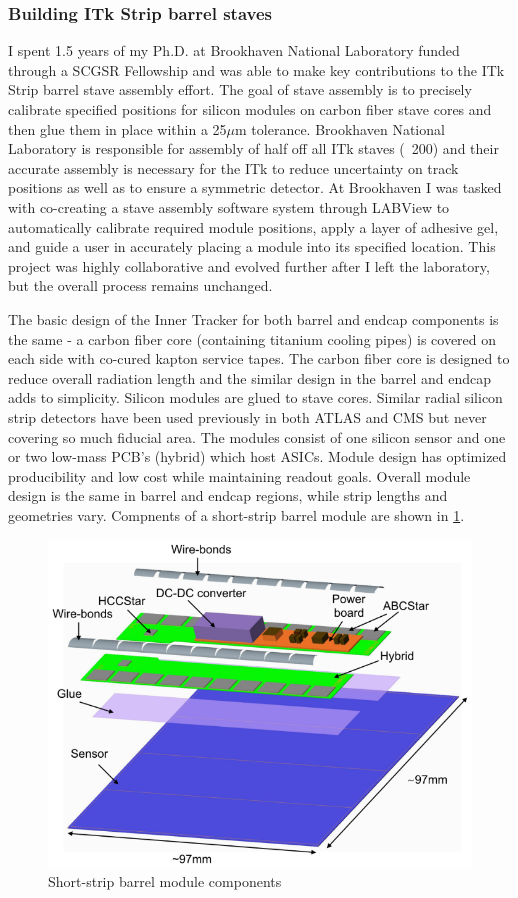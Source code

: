 \subsubsection{Building ITk Strip barrel staves}
I spent 1.5 years of my Ph.D. at Brookhaven National Laboratory funded through a SCGSR Fellowship and was able to make key contributions to the ITk Strip barrel stave assembly effort. The goal of stave assembly is to precisely calibrate specified positions for silicon modules on carbon fiber stave cores and then glue them in place within a 25$\mu$m tolerance. Brookhaven National Laboratory is responsible for assembly of half off all ITk staves (~200) and their accurate assembly is necessary for the ITk to reduce uncertainty on track positions as well as to ensure a symmetric detector. At Brookhaven I was tasked with co-creating a stave assembly software system through LABView to automatically calibrate required module positions, apply a layer of adhesive gel, and guide a user in accurately placing a module into its specified location. This project was highly collaborative and evolved further after I left the laboratory, but the overall process remains unchanged.

The basic design of the Inner Tracker for both barrel and endcap components is the same - a carbon fiber core (containing titanium cooling pipes) is covered on each side with co-cured kapton service tapes. The carbon fiber core is designed to reduce overall radiation length and the similar design in the barrel and endcap adds to simplicity. Silicon modules are glued to stave cores. Similar radial silicon strip detectors have been used previously in both ATLAS and CMS but never covering so much fiducial area. The modules consist of one silicon sensor and one or two low-mass PCB's (hybrid) which host ASICs. Module design has optimized producibility and low cost while maintaining readout goals. Overall module design is the same in barrel and endcap regions, while strip lengths and geometries vary. Compnents of a short-strip barrel module are shown in \ref{fig:module}.
\begin{figure}[!h]
        \centering
    \includegraphics[width=.4\textwidth]{Pictures/ITkmodule.png}
    \caption{Short-strip barrel module components \cite{ITktech}}
    \label{fig:module}
\end{figure}
 
